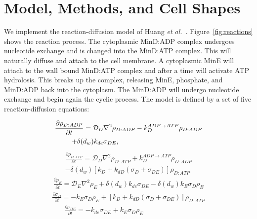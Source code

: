 \documentclass[letterpaper,twocolumn,amsmath,amssymb,pre]{revtex4-1}
\begin{document}
\section{Model, Methods, and Cell Shapes}\label{sec:model-method-shapes}
We implement the reaction-diffusion model of Huang \emph{et
  al.}~\cite{huang2003dynamic}.  Figure~\ref{fig:reactions} shows the
reaction process.  The cytoplasmic MinD:ADP complex undergoes
nucleotide exchange and is changed into the MinD:ATP complex.  This
will naturally diffuse and attach to the cell membrane.  A cytoplasmic
MinE will attach to the wall bound MinD:ATP complex and after a time
will activate ATP hydrolosis.  This breaks up the complex, releasing
MinE, phosphate, and MinD:ADP back into the cytoplasm.  The MinD:ADP
will undergo nucleotide exchange and begin again the cyclic process.
The model is defined by a set of five reaction-diffusion equations:

\begin{multline}
  \frac{\partial \rho_{D:ADP}}{\partial t} = \mathcal{D}_D\nabla^2\rho_{D:ADP}-k_D^{ADP\rightarrow ATP}\rho_{D:ADP}\\
  +\delta(d_w)k_{de}\sigma_{DE},\hspace{3.4cm}
\end{multline}
\begin{multline}
  \frac{\partial \rho_{D:ATP}}{\partial t} = \mathcal{D}_D\nabla^2\rho_{D:ATP}+k_D^{ADP\rightarrow ATP}\rho_{D:ADP}\\
  -\delta(d_w)[k_D+k_{dD}(\sigma_D+\sigma_{DE})]\rho_{D:ATP}
\end{multline}
\begin{multline}
  \frac{\partial \rho_E}{\partial t} = \mathcal{D}_E\nabla^2\rho_E+\delta(d_w)k_{de}\sigma_{DE}
  -\delta(d_w)k_E \sigma_D \rho_E
\end{multline}
\begin{multline}
  \frac{\partial \sigma_D}{\partial t} = -k_E\sigma_D\rho_E
  +[k_D+k_{dD}(\sigma_D+\sigma_{DE})]\rho_{D:ATP}
  \label{eq:d-on-wall}
\end{multline}
\begin{multline}
  \frac{\partial \sigma_{DE}}{\partial t} = -k_{de}\sigma_{DE}+k_E\sigma_D\rho_E\hspace{3cm}
  \label{eq:FifthPDE}
\end{multline}
\end{document}

